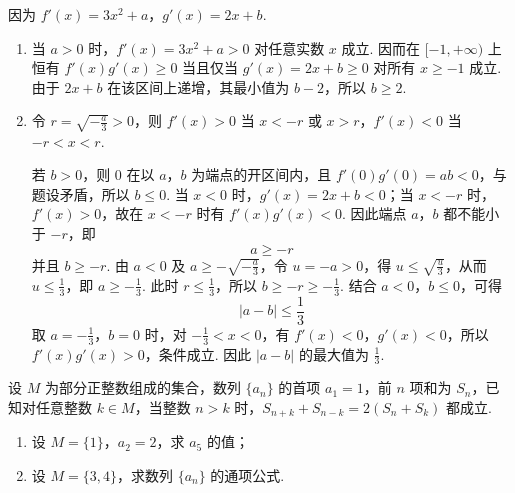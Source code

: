 \begin{solution}
因为 \(f'(x)=3x^2+a\)，\(g'(x)=2x+b\).
\begin{enumerate}
\item 当 \(a>0\) 时，\(f'(x)=3x^2+a>0\) 对任意实数 \(x\) 成立. 因而在 \([-1,+\infty)\) 上恒有 \(f'(x)g'(x)\geqslant0\) 当且仅当 \(g'(x)=2x+b\geqslant0\) 对所有 \(x\geqslant-1\) 成立. 由于 \(2x+b\) 在该区间上递增，其最小值为 \(b-2\)，所以 \(b\geqslant2\).

\item 令 \(r=\sqrt{-\frac{a}{3}}>0\)，则 \(f'(x)>0\) 当 \(x<-r\) 或 \(x>r\)，\(f'(x)<0\) 当 \(-r<x<r\).

若 \(b>0\)，则 \(0\) 在以 \(a\)，\(b\) 为端点的开区间内，且 \(f'(0)g'(0)=ab<0\)，与题设矛盾，所以 \(b\leqslant0\). 当 \(x<0\) 时，\(g'(x)=2x+b<0\)；当 \(x<-r\) 时，\(f'(x)>0\)，故在 \(x<-r\) 时有 \(f'(x)g'(x)<0\). 因此端点 \(a\)，\(b\) 都不能小于 \(-r\)，即
\[
a\geqslant-r
\]
并且 \(b\geqslant-r\).
由 \(a<0\) 及 \(a\geqslant-\sqrt{-\frac{a}{3}}\)，令 \(u=-a>0\)，得 \(u\leqslant\sqrt{\frac{u}{3}}\)，从而 \(u\leqslant\frac{1}{3}\)，即 \(a\geqslant-\frac{1}{3}\). 此时 \(r\leqslant\frac{1}{3}\)，所以 \(b\geqslant-r\geqslant-\frac{1}{3}\). 结合 \(a<0\)，\(b\leqslant0\)，可得
\[
|a-b|\leqslant\frac{1}{3}
\]
取 \(a=-\frac{1}{3}\)，\(b=0\) 时，对 \(-\frac{1}{3}<x<0\)，有 \(f'(x)<0\)，\(g'(x)<0\)，所以 \(f'(x)g'(x)>0\)，条件成立. 因此 \(|a-b|\) 的最大值为 \(\frac{1}{3}\).
\end{enumerate}
\end{solution}

\begin{problem}
设 \(M\) 为部分正整数组成的集合，数列 \(\{a_{n}\}\) 的首项 \(a_{1}=1\)，前 \(n\) 项和为 \(S_{n}\)，已知对任意整数 \(k\in M\)，当整数 \(n>k\) 时，\(S_{n+k}+S_{n-k}=2(S_{n}+S_{k})\) 都成立.

\begin{enumerate}
\item 设 \(M=\{1\}\)，\(a_{2}=2\)，求 \(a_{5}\) 的值；
\item 设 \(M=\{3,4\}\)，求数列 \(\{a_{n}\}\) 的通项公式.
\end{enumerate}
\end{problem}

